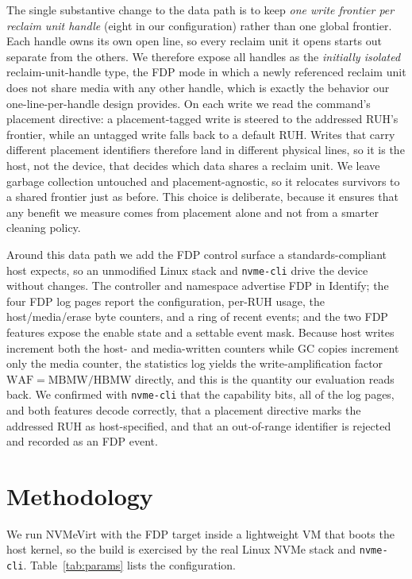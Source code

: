 \documentclass[conference,10pt]{IEEEtran}
\begin{document}
The single substantive change to the data path is to keep \emph{one write
frontier per reclaim unit handle} (eight in our configuration) rather than one
global frontier. Each handle owns its own open line, so every reclaim unit it
opens starts out separate from the others. We therefore expose all handles as the
\emph{initially isolated} reclaim-unit-handle type, the FDP mode in which a newly
referenced reclaim unit does not share media with any other handle, which is
exactly the behavior our one-line-per-handle design provides. On each write we
read the command's placement directive: a placement-tagged write is steered to
the addressed RUH's frontier, while an untagged write falls back to a default
RUH. Writes that carry different placement identifiers therefore land in
different physical lines, so it is the host, not the device, that decides which
data shares a reclaim unit. We leave garbage
collection untouched and placement-agnostic, so it relocates survivors to a
shared frontier just as before. This choice is deliberate, because it ensures
that any benefit we measure comes from placement alone and not from a smarter
cleaning policy.

Around this data path we add the FDP control surface a standards-compliant host
expects, so an unmodified Linux stack and \texttt{nvme-cli} drive the device
without changes. The controller and namespace advertise FDP in Identify; the
four FDP log pages report the configuration, per-RUH usage, the host/media/erase
byte counters, and a ring of recent events; and the two FDP features expose the
enable state and a settable event mask. Because host writes increment both the
host- and media-written counters while GC copies increment only the media
counter, the statistics log yields the write-amplification factor
$\mathrm{WAF}=\mathrm{MBMW}/\mathrm{HBMW}$ directly, and this is the quantity our
evaluation reads back. We confirmed with \texttt{nvme-cli} that the capability
bits, all of the log pages, and both features decode correctly, that a placement
directive marks the addressed RUH as host-specified, and that an out-of-range
identifier is rejected and recorded as an FDP event.

\section{Methodology}
\label{sec:method}
We run NVMeVirt with the FDP target inside a lightweight VM that boots the host
kernel, so the build is exercised by the real Linux NVMe stack and
\texttt{nvme-cli}. Table~\ref{tab:params} lists the configuration.
\end{document}
